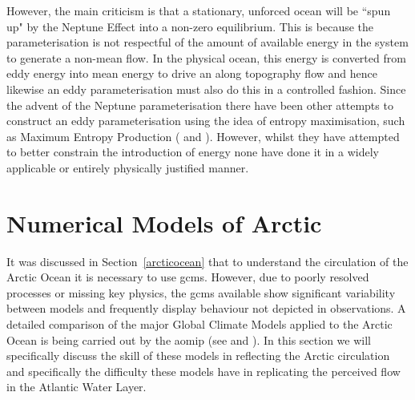 \documentclass[12pt,a4paper]{report}
\newcommand*\secref[1]{Section~\ref{#1}}
\begin{document}
                	 However, the main criticism is that a stationary, unforced ocean will
                	  be ``spun up" by the Neptune Effect into a non-zero equilibrium. 
                	  This is because the parameterisation is not respectful
                	 of the amount of available energy in the system to generate a non-mean
                	 flow. In the physical ocean, this energy is converted from eddy
                	 energy into mean energy to drive an along topography flow and
                	 hence likewise an eddy parameterisation must also do this in a controlled fashion. Since the advent of the Neptune parameterisation there
                	 have been other attempts to construct an eddy parameterisation
                	 using the idea of entropy  maximisation, such as 
                	 Maximum Entropy Production (\cite{kazantsev1998subgrid} and \cite{polyakov2001eddy}). However,
                	 whilst they have attempted to better constrain the introduction of energy none have done it in a widely applicable or entirely 
                	 physically justified manner.
                	
\section{Numerical Models of Arctic}
\label{arcticnumerics}

	It was discussed in \secref{arcticocean} that to understand the circulation of the Arctic
	 Ocean it is necessary to use \glspl{gcm}. However, due to poorly resolved processes or
	  missing key physics, the \glspl{gcm} available show significant variability between
	   models and frequently display behaviour not depicted in observations. 
	A detailed comparison of the major Global Climate Models applied to the Arctic Ocean is
	 being carried out by the \gls{aomip} (see \cite{proshutinsky2008toward} and
	  \cite{proshutinsky2011recent}). In this section we will specifically discuss the skill
	   of these models in reflecting the Arctic circulation and specifically the difficulty
	    these models have in replicating the perceived flow in the Atlantic Water Layer.  
\end{document}

